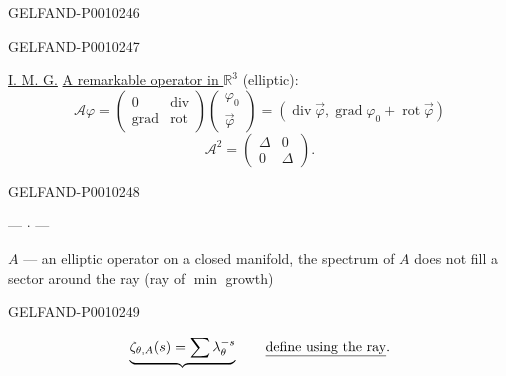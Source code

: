 \begin{GelfandAdjacentEvidence}{GELFAND-P001024}{6}

\end{GelfandAdjacentEvidence}
\begin{GelfandAdjacentEvidence}{GELFAND-P001024}{7}


\underline{I. M. G.} \underline{A remarkable operator in $\mathbb R^3$} (elliptic):
\begin{equation*}
\mathcal A\varphi=
\begin{pmatrix}0&\operatorname{div}\\\operatorname{grad}&\operatorname{rot}\end{pmatrix}
\begin{pmatrix}\varphi_0\\\vec\varphi\end{pmatrix}
=(\operatorname{div}\vec\varphi,\operatorname{grad}\varphi_0+\operatorname{rot}\vec\varphi)
\tag{17}
\end{equation*}
\[
\mathcal A^2=\begin{pmatrix}\Delta&0\\0&\Delta\end{pmatrix}.
\]
\end{GelfandAdjacentEvidence}
\begin{GelfandAdjacentEvidence}{GELFAND-P001024}{8}


\begin{center}--- $\cdot$ ---\end{center}

$A$ --- an elliptic operator on a closed manifold, the spectrum of $A$ does not fill a sector around the ray (ray of $\min$ growth)
\end{GelfandAdjacentEvidence}
\begin{GelfandAdjacentEvidence}{GELFAND-P001024}{9}


\[
\underbrace{\zeta_{\theta,A}(s)=\sum\lambda_\theta^{-s}}_{\vphantom{\lambda}}
\qquad \text{\underline{define using the ray}.}
\]
\end{GelfandAdjacentEvidence}
